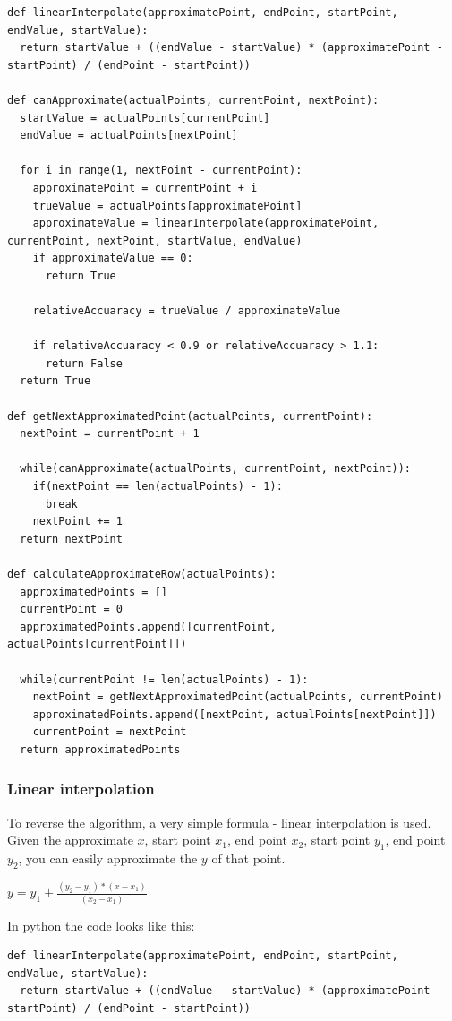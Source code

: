 \documentclass[12pt]{article}
\begin{document}
\begin{verbatim}
def linearInterpolate(approximatePoint, endPoint, startPoint, endValue, startValue):
  return startValue + ((endValue - startValue) * (approximatePoint - startPoint) / (endPoint - startPoint))

def canApproximate(actualPoints, currentPoint, nextPoint):
  startValue = actualPoints[currentPoint]
  endValue = actualPoints[nextPoint]

  for i in range(1, nextPoint - currentPoint):
    approximatePoint = currentPoint + i
    trueValue = actualPoints[approximatePoint]
    approximateValue = linearInterpolate(approximatePoint, currentPoint, nextPoint, startValue, endValue)
    if approximateValue == 0:
      return True

    relativeAccuaracy = trueValue / approximateValue

    if relativeAccuaracy < 0.9 or relativeAccuaracy > 1.1:
      return False
  return True

def getNextApproximatedPoint(actualPoints, currentPoint):
  nextPoint = currentPoint + 1

  while(canApproximate(actualPoints, currentPoint, nextPoint)):
    if(nextPoint == len(actualPoints) - 1):
      break
    nextPoint += 1
  return nextPoint

def calculateApproximateRow(actualPoints):
  approximatedPoints = []
  currentPoint = 0
  approximatedPoints.append([currentPoint, actualPoints[currentPoint]])

  while(currentPoint != len(actualPoints) - 1):
    nextPoint = getNextApproximatedPoint(actualPoints, currentPoint)
    approximatedPoints.append([nextPoint, actualPoints[nextPoint]])
    currentPoint = nextPoint
  return approximatedPoints

\end{verbatim}

\subsubsection{Linear interpolation}
To reverse the algorithm, a very simple formula - linear interpolation is used. Given the approximate $x$, start point $x_1$, end point $x_2$, start point $y_1$, end point $y_2$, you can easily approximate the $y$ of that point.

$y = y_1 + \frac{(y_2 - y_1) * (x - x_1)}{(x_2 - x_1)}$

In python the code looks like this:

\begin{verbatim}
def linearInterpolate(approximatePoint, endPoint, startPoint, endValue, startValue):
  return startValue + ((endValue - startValue) * (approximatePoint - startPoint) / (endPoint - startPoint))
\end{verbatim}
\end{document}
